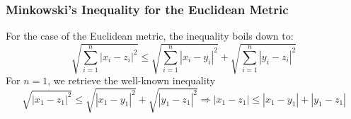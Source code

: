 \begin{frame}
\frametitle{Minkowski's Inequality for the Euclidean Metric}
For the case of the Euclidean metric, the inequality boils down to:
\begin{equation*}
    \sqrt{\sum_{i=1}^{n} |x_i - z_i|^2} \leq  \sqrt{\sum_{i=1}^{n} |x_i - y_i|^2} +  \sqrt{\sum_{i=1}^{n} |y_i - z_i|^2}
\end{equation*}
For $n=1$, we retrieve the well-known inequality
\begin{equation*}
    \sqrt{|x_1 - z_1|^2} \leq  \sqrt{|x_1 - y_1|^2} +  \sqrt{|y_1 - z_1|^2}
\Rightarrow|x_1 - z_1|\leq |x_1 - y_1|+|y_1 - z_1|
\end{equation*} 
\end{frame}